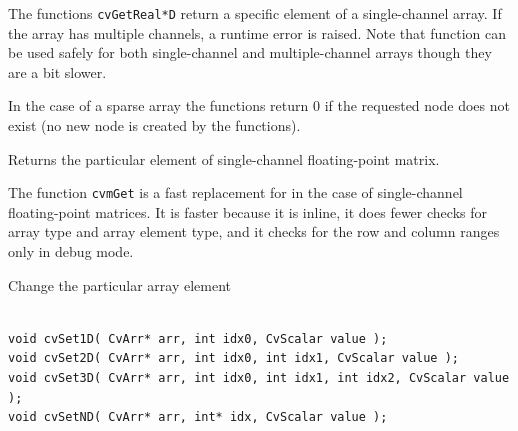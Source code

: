 \begin{description}
\end{description}


The functions \texttt{cvGetReal*D} return a specific element of a single-channel array. If the array has multiple channels, a runtime error is raised. Note that  function can be used safely for both single-channel and multiple-channel arrays though they are a bit slower.

In the case of a sparse array the functions return 0 if the requested node does not exist (no new node is created by the functions).

\label{mGet}

Returns the particular element of single-channel floating-point matrix.


\begin{description}
\end{description}

The function \texttt{cvmGet} is a fast replacement for 
in the case of single-channel floating-point matrices. It is faster because
it is inline, it does fewer checks for array type and array element type,
and it checks for the row and column ranges only in debug mode.

\label{SetnD}

Change the particular array element

\begin{lstlisting}

void cvSet1D( CvArr* arr, int idx0, CvScalar value );
void cvSet2D( CvArr* arr, int idx0, int idx1, CvScalar value );
void cvSet3D( CvArr* arr, int idx0, int idx1, int idx2, CvScalar value );
void cvSetND( CvArr* arr, int* idx, CvScalar value );

\end{lstlisting}

\begin{description}
\end{description}


